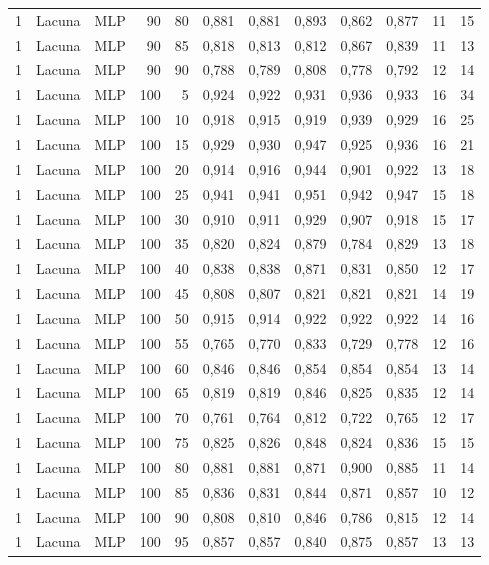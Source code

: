 \begin{longtable}{@{}rllrrrrrrrrr@{}}
1 & Lacuna & MLP & 90 & 80 & 0,881 & 0,881 & 0,893 & 0,862 & 0,877 & 11 & 15 \\
1 & Lacuna & MLP & 90 & 85 & 0,818 & 0,813 & 0,812 & 0,867 & 0,839 & 11 & 13 \\
1 & Lacuna & MLP & 90 & 90 & 0,788 & 0,789 & 0,808 & 0,778 & 0,792 & 12 & 14 \\
1 & Lacuna & MLP & 100 & 5 & 0,924 & 0,922 & 0,931 & 0,936 & 0,933 & 16 & 34 \\
1 & Lacuna & MLP & 100 & 10 & 0,918 & 0,915 & 0,919 & 0,939 & 0,929 & 16 & 25 \\
1 & Lacuna & MLP & 100 & 15 & 0,929 & 0,930 & 0,947 & 0,925 & 0,936 & 16 & 21 \\
1 & Lacuna & MLP & 100 & 20 & 0,914 & 0,916 & 0,944 & 0,901 & 0,922 & 13 & 18 \\
1 & Lacuna & MLP & 100 & 25 & 0,941 & 0,941 & 0,951 & 0,942 & 0,947 & 15 & 18 \\
1 & Lacuna & MLP & 100 & 30 & 0,910 & 0,911 & 0,929 & 0,907 & 0,918 & 15 & 17 \\
1 & Lacuna & MLP & 100 & 35 & 0,820 & 0,824 & 0,879 & 0,784 & 0,829 & 13 & 18 \\
1 & Lacuna & MLP & 100 & 40 & 0,838 & 0,838 & 0,871 & 0,831 & 0,850 & 12 & 17 \\
1 & Lacuna & MLP & 100 & 45 & 0,808 & 0,807 & 0,821 & 0,821 & 0,821 & 14 & 19 \\
1 & Lacuna & MLP & 100 & 50 & 0,915 & 0,914 & 0,922 & 0,922 & 0,922 & 14 & 16 \\
1 & Lacuna & MLP & 100 & 55 & 0,765 & 0,770 & 0,833 & 0,729 & 0,778 & 12 & 16 \\
1 & Lacuna & MLP & 100 & 60 & 0,846 & 0,846 & 0,854 & 0,854 & 0,854 & 13 & 14 \\
1 & Lacuna & MLP & 100 & 65 & 0,819 & 0,819 & 0,846 & 0,825 & 0,835 & 12 & 14 \\
1 & Lacuna & MLP & 100 & 70 & 0,761 & 0,764 & 0,812 & 0,722 & 0,765 & 12 & 17 \\
1 & Lacuna & MLP & 100 & 75 & 0,825 & 0,826 & 0,848 & 0,824 & 0,836 & 15 & 15 \\
1 & Lacuna & MLP & 100 & 80 & 0,881 & 0,881 & 0,871 & 0,900 & 0,885 & 11 & 14 \\
1 & Lacuna & MLP & 100 & 85 & 0,836 & 0,831 & 0,844 & 0,871 & 0,857 & 10 & 12 \\
1 & Lacuna & MLP & 100 & 90 & 0,808 & 0,810 & 0,846 & 0,786 & 0,815 & 12 & 14 \\
1 & Lacuna & MLP & 100 & 95 & 0,857 & 0,857 & 0,840 & 0,875 & 0,857 & 13 & 13 \\

\end{longtable}
